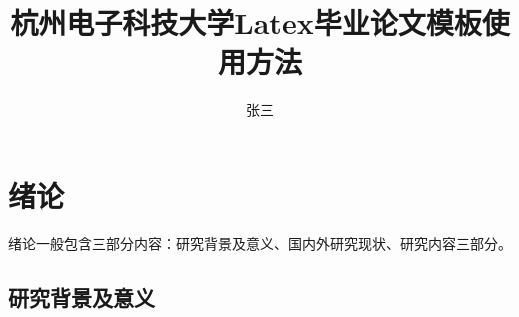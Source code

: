 \documentclass[master]{styles/hdu-thesis}
\title{杭州电子科技大学Latex毕业论文模板使用方法}{Munual of latex on thesis for HDU}
\author{张三}{San Zhang}%
\begin{document}
\makecover
\makedeclaration




























\figurelist

\tablelist

\tableofcontents



\chapter{绪论}
绪论一般包含三部分内容：研究背景及意义、国内外研究现状、研究内容三部分。
\section{研究背景及意义}
\end{document}
